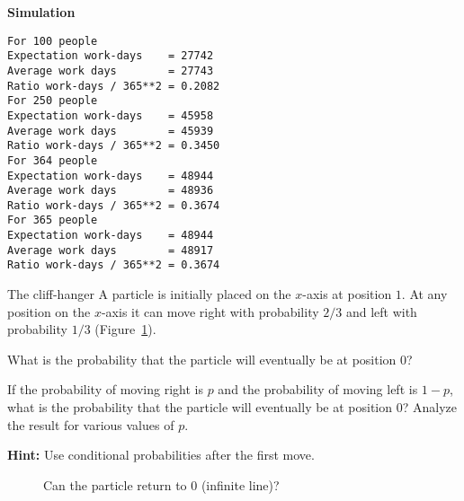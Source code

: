 \textbf{Simulation}
\begin{verbatim}
For 100 people
Expectation work-days    = 27742
Average work days        = 27743
Ratio work-days / 365**2 = 0.2082
For 250 people
Expectation work-days    = 45958
Average work days        = 45939
Ratio work-days / 365**2 = 0.3450
For 364 people
Expectation work-days    = 48944
Average work days        = 48936
Ratio work-days / 365**2 = 0.3674
For 365 people
Expectation work-days    = 48944
Average work days        = 48917
Ratio work-days / 365**2 = 0.3674
\end{verbatim}


\begin{prob}{The cliff-hanger}
A particle is initially placed on the $x$-axis at position $1$. At any position on the $x$-axis it can move right with probability $2/3$ and left with probability $1/3$ (Figure~\ref{f.ruin1}).

 What is the probability that the particle will eventually be at position $0$?

 If the probability of moving right is $p$ and the probability of moving left is $1-p$, what is the probability that the particle will eventually be at position $0$? Analyze the result for various values of $p$.

\textbf{Hint:} Use conditional probabilities after the first move.
\begin{figure}[tb]
\begin{center}
\end{center}
\caption{Can the particle return to $0$ (infinite line)?}\label{f.ruin1}
\end{figure}

\end{prob}

